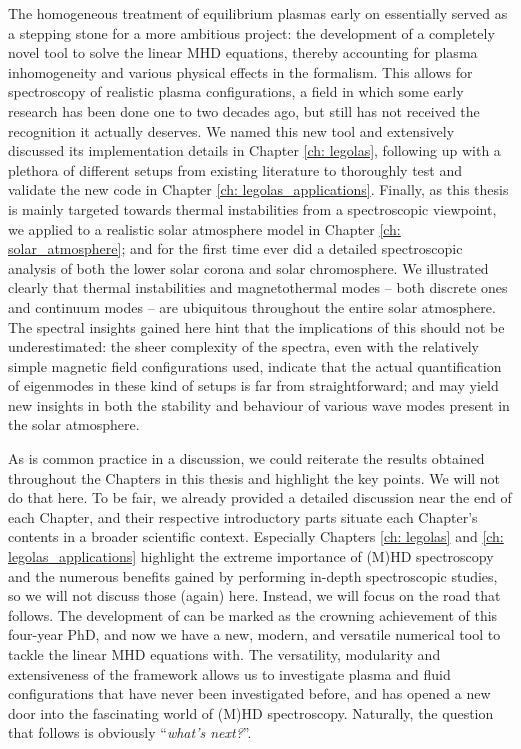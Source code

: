 The homogeneous treatment of equilibrium plasmas early on essentially served as a stepping stone for a more ambitious project: the development of a completely novel tool to solve the linear MHD equations, thereby accounting for plasma inhomogeneity and various physical effects in the formalism. This allows for spectroscopy of realistic plasma configurations, a field in which some early research has been done one to two decades ago, but still has not received the recognition it actually deserves. We named this new tool {\legolas} and extensively discussed its implementation details in Chapter \ref{ch: legolas}, following up with a plethora of different setups from existing literature to thoroughly test and validate the new code in Chapter \ref{ch: legolas_applications}. Finally, as this thesis is mainly targeted towards thermal instabilities from a spectroscopic viewpoint, we applied {\legolas} to a realistic solar atmosphere model in Chapter \ref{ch: solar_atmosphere}; and for the first time ever did a detailed spectroscopic analysis of both the lower solar corona and solar chromosphere. We illustrated clearly that thermal instabilities and magnetothermal modes -- both discrete ones and continuum modes -- are ubiquitous throughout the entire solar atmosphere. The spectral insights gained here hint that the implications of this should not be underestimated: the sheer complexity of the spectra, even with the relatively simple magnetic field configurations used, indicate that the actual quantification of eigenmodes in these kind of setups is far from straightforward; and may yield new insights in both the stability and behaviour of various wave modes present in the solar atmosphere.

As is common practice in a discussion, we could reiterate the results obtained throughout the Chapters in this thesis and highlight the key points. We will not do that here. To be fair, we already provided a detailed discussion near the end of each Chapter, and their respective introductory parts situate each Chapter's contents in a broader scientific context. Especially Chapters \ref{ch: legolas} and \ref{ch: legolas_applications} highlight the extreme importance of (M)HD spectroscopy and the numerous benefits gained by performing in-depth spectroscopic studies, so we will not discuss those (again) here. Instead, we will focus on the road that follows. The development of {\legolas} can be marked as the crowning achievement of this four-year PhD, and now we have a new, modern, and versatile numerical tool to tackle the linear MHD equations with. The versatility, modularity and extensiveness of the {\legolas} framework allows us to investigate plasma and fluid configurations that have never been investigated before, and has opened a new door into the fascinating world of (M)HD spectroscopy. Naturally, the question that follows is obviously ``\emph{what's next?}''.

